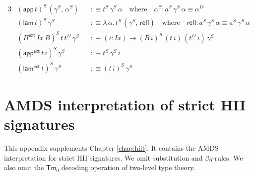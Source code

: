 \documentclass[12pt,a4paper,twoside,openany]{book}
\theoremstyle{remark}
\theoremstyle{definition}
\theoremstyle{theorem}
\newcommand{\mi}[1]{\mathit{#1}}
\newcommand{\ms}[1]{\mathsf{#1}}
\newcommand{\refl}{\mathsf{refl}}
\newcommand{\Tm}{\mathsf{Tm}}
\newcommand{\Pie}{\Pi^{\mathsf{ext}}}
\newcommand{\appe}{\mathsf{app^{ext}}}
\newcommand{\lame}{\mathsf{lam^{ext}}}
\newcommand{\app}{\ms{app}}
\newcommand{\lam}{\ms{lam}}
\newcommand{\defn}{:\equiv}
\begin{document}
\begin{alignat*}{3}
  &(\app\,t)^S\,(\gamma^S,\,\alpha^S) &&\defn t^S\,\gamma^S\,\alpha\hspace{1em}\text{where}\hspace{1em} \alpha^S : a^S\,\gamma^S\,\alpha \equiv \alpha^D\\
  &(\lam\,t)^S\,\gamma^S &&\defn \lambda\,\alpha.\,t^S\,(\gamma^S,\,\refl)\hspace{1em}\text{where}\hspace{1em} \refl : a^S\,\gamma^S\,\alpha \equiv a^S\,\gamma^S\,\alpha\\
  &(\Pie\,\mi{Ix}\,B)^S\,t\,t^D\,\gamma^S &&\defn (i : \mi{Ix}) \to (B\,i)^S\,(t\,i)\,(t^D\,i)\,\gamma^S\\
  &(\appe\,t\,i)^S\,\gamma^S &&\defn t^S\,\gamma^S\,i\\
  &(\lame\,t)^S\,\gamma^S &&\defn (t\,i)^S\,\gamma^S
\end{alignat*}

\chapter{AMDS interpretation of strict HII signatures}
\label{app:hii-amds}

This appendix supplements Chapter \ref{chap:hiit}. It contains the AMDS
interpretation for strict HII signatures. We omit substitution and
$\beta\eta$-rules. We also omit the $\Tm_0$ decoding operation of two-level type
theory.

\pagebreak
\end{document}
